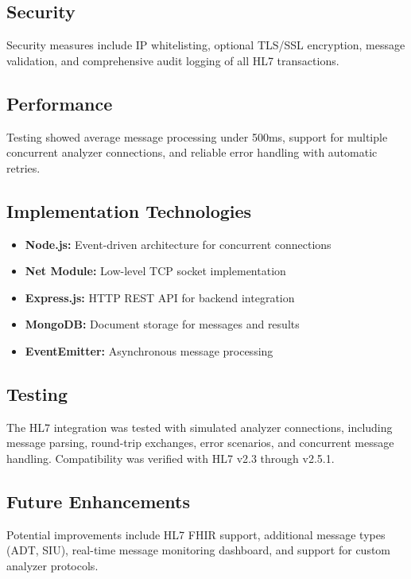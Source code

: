 \documentclass[12pt, a4paper]{report}
\begin{document}
\subsection{Security}

Security measures include IP whitelisting, optional TLS/SSL encryption, message validation, and comprehensive audit logging of all HL7 transactions.

\subsection{Performance}

Testing showed average message processing under 500ms, support for multiple concurrent analyzer connections, and reliable error handling with automatic retries.

\subsection{Implementation Technologies}

\begin{itemize}
    \item \textbf{Node.js:} Event-driven architecture for concurrent connections
    \item \textbf{Net Module:} Low-level TCP socket implementation
    \item \textbf{Express.js:} HTTP REST API for backend integration
    \item \textbf{MongoDB:} Document storage for messages and results
    \item \textbf{EventEmitter:} Asynchronous message processing
\end{itemize}

\subsection{Testing}

The HL7 integration was tested with simulated analyzer connections, including message parsing, round-trip exchanges, error scenarios, and concurrent message handling. Compatibility was verified with HL7 v2.3 through v2.5.1.

\subsection{Future Enhancements}

Potential improvements include HL7 FHIR support, additional message types (ADT, SIU), real-time message monitoring dashboard, and support for custom analyzer protocols.
\end{document}
